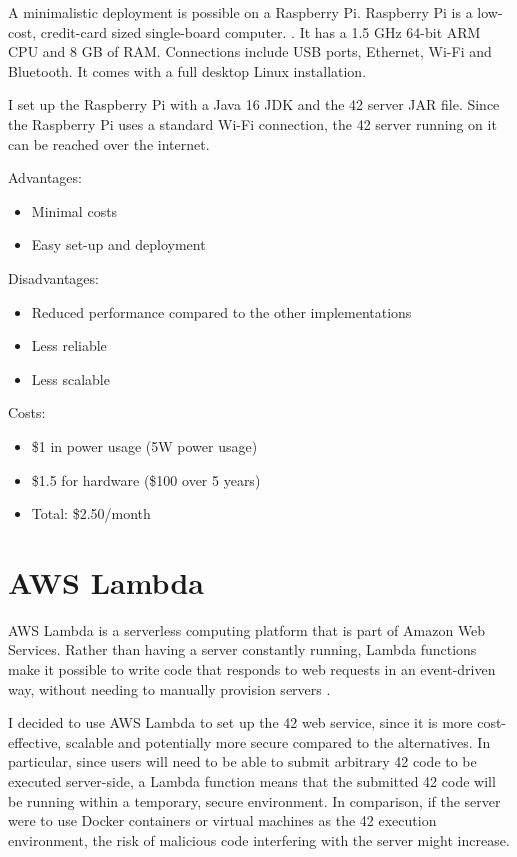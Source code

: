 A minimalistic deployment is possible on a Raspberry Pi. Raspberry Pi is a low-cost, credit-card sized single-board computer. \cite{raspberry-pi-foundation-2015}. It has a 1.5 GHz 64-bit ARM CPU and 8 GB of RAM. Connections include USB ports, Ethernet, Wi-Fi and Bluetooth. It comes with a full desktop Linux installation.

I set up the Raspberry Pi with a Java 16 JDK and the 42 server JAR file. Since the Raspberry Pi uses a standard Wi-Fi connection, the 42 server running on it can be reached over the internet.


Advantages:

\begin{itemize}
\item Minimal costs
\item Easy set-up and deployment
\end{itemize}

Disadvantages:

\begin{itemize}
\item Reduced performance compared to the other implementations
\item Less reliable
\item Less scalable
\end{itemize}

Costs:

\begin{itemize}
\item \$1 in power usage (5W power usage) \cite{neukirchen-2021}
\item \$1.5 for hardware (\$100 over 5 years)
\item Total: \$2.50/month
\end{itemize}

\section{AWS Lambda}

AWS Lambda is a serverless computing platform that is part of Amazon Web Services. Rather than having a server constantly running, Lambda functions make it possible to write code that responds to web requests in an event-driven way, without needing to manually provision servers \cite{amazon-web-services-inc-2022A}.

I decided to use AWS Lambda to set up the 42 web service, since it is more cost-effective, scalable and potentially more secure compared to the alternatives. In particular, since users will need to be able to submit arbitrary 42 code to be executed server-side, a Lambda function means that the submitted 42 code will be running within a temporary, secure environment. In comparison, if the server were to use Docker containers or virtual machines as the 42 execution environment, the risk of malicious code interfering with the server might increase.

